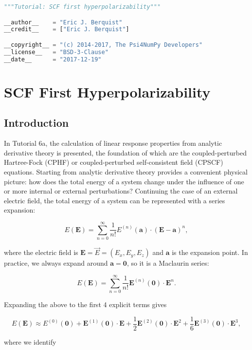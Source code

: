 \documentclass[]{article}
\date{}
\begin{document}
\begin{lstlisting}[language=Python]
"""Tutorial: SCF first hyperpolarizability"""

__author__    = "Eric J. Berquist"
__credit__    = ["Eric J. Berquist"]

__copyright__ = "(c) 2014-2017, The Psi4NumPy Developers"
__license__   = "BSD-3-Clause"
__date__      = "2017-12-19"
\end{lstlisting}

\hypertarget{scf-first-hyperpolarizability}{%
\section{SCF First
Hyperpolarizability}\label{scf-first-hyperpolarizability}}

\hypertarget{introduction}{%
\subsection{Introduction}\label{introduction}}

In Tutorial 6a, the calculation of linear response properties from
analytic derivative theory is presented, the foundation of which are the
coupled-perturbed Hartree-Fock (CPHF) or coupled-perturbed
self-consistent field (CPSCF) equations. Starting from analytic
derivative theory provides a convenient physical picture: how does the
total energy of a system change under the influence of one or more
internal or external perturbations? Continuing the case of an external
electric field, the total energy of a system can be represented with a
series expansion:

\[
E(\mathbf{E}) = \sum_{n=0}^{\infty} \frac{1}{n!}E^{(n)}(\mathbf{a})\cdot(\mathbf{E}-\mathbf{a})^{n},
\]

where the electric field is \(\mathbf{E} = \vec{E} = (E_x,E_y,E_z)\) and
\(\mathbf{a}\) is the expansion point. In practice, we always expand
around \(\mathbf{a} = \mathbf{0}\), so it is a Maclaurin series:

\[
E(\mathbf{E}) = \sum_{n=0}^{\infty} \frac{1}{n!}\mathbf{E}^{(n)}(\mathbf{0})\cdot\mathbf{E}^{n}.
\]

Expanding the above to the first 4 explicit terms gives

\[
E(\mathbf{E}) \approx E^{(0)}(\mathbf{0}) + \mathbf{E}^{(1)}(\mathbf{0})\cdot\mathbf{E} + \frac{1}{2}\mathbf{E}^{(2)}(\mathbf{0})\cdot\mathbf{E}^{2} + \frac{1}{6}\mathbf{E}^{(3)}(\mathbf{0})\cdot\mathbf{E}^{3},
\]

where we identify
\end{document}
